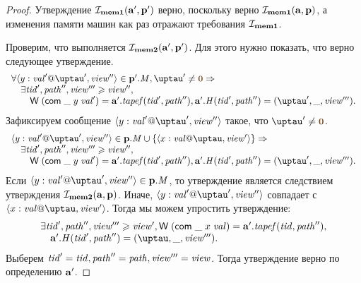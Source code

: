 \begin{proof}
Утверждение $\mathcal{I}_{\rm \bf mem1}(\mathbf{a}', \mathbf{p}')$ верно, поскольку верно $\mathcal{I}_{\rm \bf mem1}(\mathbf{a}, \mathbf{p})$, а изменения памяти машин
как раз отражают требования $\mathcal{I}_{\rm \bf mem1}$.

Проверим, что выполняется $\mathcal{I}_{\rm \bf mem2}(\mathbf{a}', \mathbf{p}')$. Для этого нужно показать, что верно следующее утверждение.
  \[\begin{array}{l}
  \forall \writeEvt{y}{\stval'}{\tau'}{\R''} \in \p'.\Mprom, \tau' \not = \tstamp{0} => \\
  \quad \exists \tId', \cpath'', \R''' \ge \R'', \\
  \quad \quad \tapeWrite{(\tapeWriteCommitted{\_}{y}{\stval'})} = \aT'.\tapef(\tId', \cpath''),
        \aT'.\hmap(\tId', \cpath'') = (\tau', \_, \R'''). \\
  \end{array}\]
Зафиксируем сообщение $\writeEvt{y}{\stval'}{\tau'}{\R''}$ такое, что $\tau' \not = \tstamp{0}$.
  \[\begin{array}{l}
  \writeEvt{y}{\stval'}{\tau'}{\R''} \in \p.\Mprom \cup \{\writeEvt{x}{\stval}{\tau}{\R'}\} => \\
  \quad \exists \tId', \cpath'', \R''' \ge \R'', \\
  \quad \quad \tapeWrite{(\tapeWriteCommitted{\_}{y}{\stval'})} = \aT'.\tapef(\tId', \cpath''),
        \aT'.\hmap(\tId', \cpath'') = (\tau', \_, \R'''). \\
  \end{array}\]
Если $\writeEvt{y}{\stval'}{\tau'}{\R''} \in \p.\Mprom$, то утверждение является следствием утверждения $\mathcal{I}_{\rm \bf mem2}(\mathbf{a}, \mathbf{p})$.
Иначе, $\writeEvt{y}{\stval'}{\tau'}{\R''}$ совпадает с $\writeEvt{x}{\stval}{\tau}{\R'}$.
Тогда мы можем упростить утверждение:
      \[\begin{array}{l}
    \exists \tId', \cpath'', \R''' \ge \R',
      \tapeWrite{(\tapeWriteCommitted{\_}{x}{\stval})} = \aT'.\tapef(\tId, \cpath''), \\
      \quad \aT'.\hmap(\tId', \cpath'') = (\tau, \_, \R'''). \\
      \end{array}\]
Выберем $\mathit{tid}' = \mathit{tid}, \mathit{path}'' = \mathit{path}, \mathit{view}''' = \mathit{view}$. Тогда утверждение верно по определению $\mathbf{a}'$.
\end{proof}
